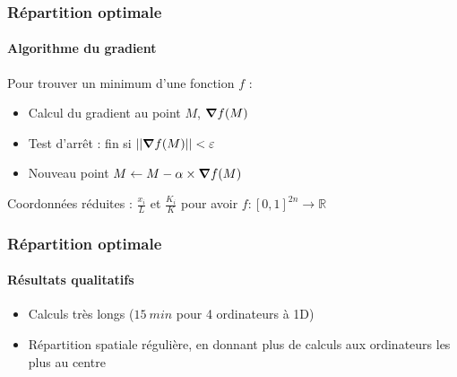 \documentclass[a4paper,11pt]{beamer}
\begin{document}
\begin{frame}
    \frametitle{Répartition optimale}
    \framesubtitle{Algorithme du gradient}

    Pour trouver un minimum d'une fonction $f$ :
    \begin{itemize}
        \item Calcul du gradient au point $M$, $\grad f (M)$
        \item Test d'arrêt : fin si $||\grad f (M)|| < \varepsilon$
        \item Nouveau point $M \leftarrow M - \alpha \times \grad f (M)$
    \end{itemize}

    Coordonnées réduites : $\frac{x_i}{L}$ et $\frac{K_i}{K}$ pour avoir $f : [0, 1]^{2n} \rightarrow \mathbb{R}$
\end{frame}

\begin{frame}
    \frametitle{Répartition optimale}
    \framesubtitle{Résultats qualitatifs}

    \begin{itemize}
        \item Calculs très longs ($\SI{15}{min}$ pour 4 ordinateurs à 1D)
        \item Répartition spatiale régulière, en donnant plus de calculs aux ordinateurs les plus au centre
    \end{itemize}
\end{frame}

\end{document}
